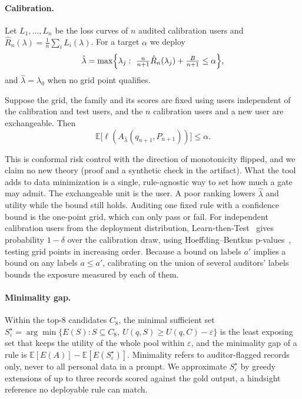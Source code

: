 \paragraph{Calibration.}
Let $L_1,\dots,L_n$ be the loss curves of $n$ audited calibration users and
$\hat R_n(\lambda)=\frac1n\sum_i L_i(\lambda)$. For a target $\alpha$ we deploy
\begin{equation}
\hat\lambda=\max\Bigl\{\lambda_j:\ \tfrac{n}{n+1}\hat R_n(\lambda_j)+\tfrac{B}{n+1}\le\alpha\Bigr\},
\label{eq:crc}
\end{equation}
and $\hat\lambda=\lambda_0$ when no grid point qualifies.

\begin{proposition}
\label{prop:cert}
Suppose the grid, the family and its scores are fixed using users independent
of the calibration and test users, and the $n$ calibration users and a new
user are exchangeable. Then
\[
\mathbb{E}\bigl[\ell(A_{\hat\lambda}(q_{n+1},P_{n+1}))\bigr]\le\alpha.
\]
\end{proposition}

This is conformal risk control with the direction of monotonicity flipped, and
we claim no new theory (proof and a synthetic check in the artifact). What the
tool adds to data minimization is a single, rule-agnostic way to set how much a
gate may admit. The exchangeable unit is the user. A poor ranking lowers
$\hat\lambda$ and utility while the bound still holds. Auditing one fixed rule
with a confidence bound is the one-point grid, which can only pass or fail.
For independent calibration users from the deployment distribution,
Learn-then-Test~\cite{angelopoulos2025learn} gives probability $1-\delta$
over the calibration draw, using
Hoeffding--Bentkus p-values~\cite{bates2021distribution}, testing grid points
in increasing order. Because a bound on labels $a'$ implies a bound on any
labels $a\le a'$, calibrating on the union of several auditors' labels
bounds the exposure measured by each of them.

\paragraph{Minimality gap.}
Within the top-8 candidates $C_8$, the minimal sufficient set
$S^\star_\varepsilon=\arg\min\{E(S): S\subseteq C_8,\ U(q,S)\ge U(q,C)-\varepsilon\}$
is the least exposing set that keeps the utility of the whole pool within
$\varepsilon$, and the minimality gap of a rule is
$\mathbb{E}[E(A)]-\mathbb{E}[E(S^\star_\varepsilon)]$. Minimality refers to auditor-flagged records only, never to all personal data
in a prompt. We approximate $S^\star_\varepsilon$ by greedy extensions of up to
three records scored against the gold output, a hindsight reference no
deployable rule can match.
